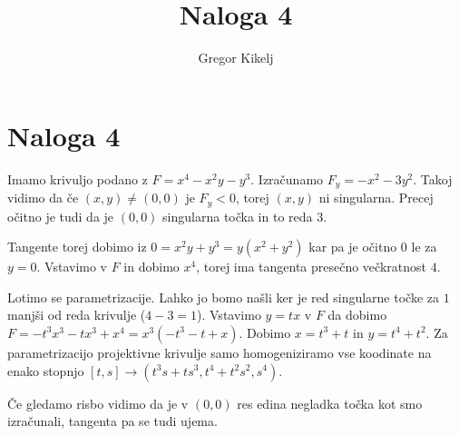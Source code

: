 \documentclass[12pt]{article}
\title{Naloga 4}
\author{Gregor Kikelj}
\begin{document}
\section{Naloga 4}
Imamo krivuljo podano z $F=x^{4} - x^{2} y - y^{3}$. Izračunamo $F_y=- x^{2} - 3 y^{2}$. Takoj vidimo da če $(x, y)\neq (0, 0)$ je $F_y<0$, torej $(x, y)$ ni singularna. 
Precej očitno je tudi da je $(0, 0)$ singularna točka in to reda $3$. 

Tangente torej dobimo iz $0=x^2y+y^3=y(x^2+y^2)$ kar pa je očitno $0$ le za $y=0$. Vstavimo v $F$ in dobimo $x^4$, torej ima tangenta presečno večkratnost $4$. 

Lotimo se parametrizacije. Lahko jo bomo našli ker je red singularne točke za $1$ manjši od reda krivulje ($4-3=1$). Vstavimo $y=tx$ v $F$ da dobimo $F=- t^{3} x^{3} - t x^{3} + x^{4}=x^{3} \left(- t^{3} - t + x\right)$.
Dobimo $x=t^3+t$ in $y=t^4+t^2$. Za parametrizacijo projektivne krivulje samo homogeniziramo vse koodinate na enako stopnjo $[t, s] \to (t^3s+ts^3, t^4+t^2s^2, s^4)$. 

Če gledamo risbo vidimo da je v $(0, 0)$ res edina negladka točka kot smo izračunali, tangenta pa se tudi ujema. 
\end{document}
